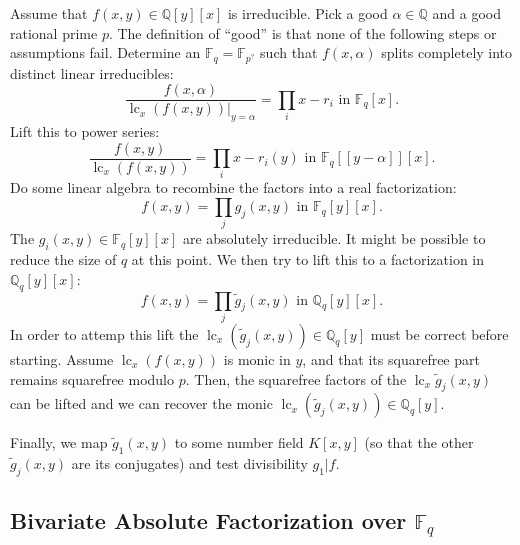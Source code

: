 \documentclass[11pt,reqno]{amsart}
\numberwithin{equation}{section}
\begin{document}
Assume that $f(x,y) \in \mathbb{Q}[y][x]$ is irreducible. Pick a good $\alpha 
\in \mathbb{Q}$ and a good rational prime $p$. The definition of ``good'' is 
that none of the following steps or assumptions fail. Determine an 
$\mathbb{F}_q = \mathbb{F}_{p^?}$ such that $f(x,\alpha)$ splits completely 
into distinct linear irreducibles:
\begin{equation*}
\frac{f(x,\alpha)}{\operatorname{lc}_x(f(x,y)) |_{y=\alpha}} = \prod_i x - r_i 
\text{ in } \mathbb{F}_q[x]\text{.}
\end{equation*}
Lift this to power series:
\begin{equation*}
\frac{f(x,y)}{\operatorname{lc}_x(f(x,y))} = \prod_i x - r_i(y) \text{ in } 
\mathbb{F}_q[[y-\alpha]][x]\text{.}
\end{equation*}
Do some linear algebra to recombine the factors into a real factorization:
\begin{equation*}
f(x,y) = \prod_j g_j(x,y) \text{ in } \mathbb{F}_q[y][x]\text{.}
\end{equation*}
The $g_i(x,y) \in \mathbb{F}_q[y][x]$ are absolutely irreducible. It might be 
possible to reduce the size of $q$ at this point. We then try to lift this to a 
factorization in $\mathbb{Q}_q[y][x]$:
\begin{equation*}
f(x,y) = \prod_j \widetilde{g}_j(x,y) \text{ in } \mathbb{Q}_q[y][x]\text{.}
\end{equation*}
In order to attemp this lift the $\operatorname{lc}_x(\widetilde{g}_j(x,y)) \in 
\mathbb{Q}_q[y]$ must be correct before starting. Assume 
$\operatorname{lc}_x(f(x,y))$ is monic in $y$, and that its squarefree part 
remains squarefree modulo $p$. Then, the squarefree factors of the 
$\operatorname{lc}_x \widetilde{g}_j(x,y)$ can be lifted and we can recover the 
monic $\operatorname{lc}_x(\widetilde{g}_j(x,y)) \in \mathbb{Q}_q[y]$.

Finally, we map $\widetilde{g}_1(x,y)$ to some number field $K[x,y]$ (so that 
the other $\widetilde{g}_j(x,y)$ are its conjugates) and test divisibility 
$g_1|f$.

\subsection{Bivariate Absolute Factorization over $\mathbb{F}_q$}
\end{document}

